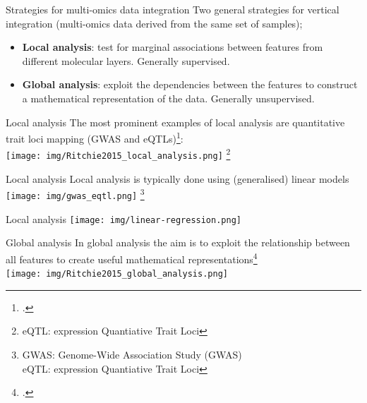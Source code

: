 \documentclass[aspectratio=169,notes]{beamer}
\newcommand\blfootnote[1]{%
  \begingroup
  \renewcommand\thefootnote{}\footnote{#1}%
  \addtocounter{footnote}{-1}%
  \endgroup
}
\begin{document}
	\begin{frame}{Strategies for multi-omics data integration}
	Two general strategies for vertical integration (multi-omics data derived from the same set of samples);
	\begin{itemize}
		\item \textbf{Local analysis}: test for marginal associations between features from different molecular layers. Generally supervised.
		\item \textbf{Global analysis}: exploit the dependencies between the features to construct a mathematical representation of the data. Generally unsupervised.
	\end{itemize}	
	\end{frame}

	\begin{frame}{Local analysis}
	The most prominent examples of local analysis are quantitative trait loci mapping (GWAS and eQTLs)\footcite{Ritchie2015}:\\
	\leavevmode\newline
	\centering
	\texttt{[image: img/Ritchie2015\_local\_analysis.png]}
	\blfootnote{eQTL: expression Quantiative Trait Loci}
	\end{frame}

	\begin{frame}{Local analysis}
	Local analysis is typically done using (generalised) linear models\\
	\leavevmode\newline
	\centering
	\texttt{[image: img/gwas\_eqtl.png]}
	\blfootnote{GWAS: Genome-Wide Association Study (GWAS)\\eQTL: expression Quantiative Trait Loci}
	\end{frame}

	\begin{frame}{Local analysis}
	\leavevmode\newline
	\centering
	\texttt{[image: img/linear-regression.png]}
	\end{frame}



	\begin{frame}{Global analysis}
	In global analysis the aim is to exploit the relationship between all features to create useful mathematical representations\footcite{Ritchie2015}\\
	\leavevmode\newline
	\centering
	\texttt{[image: img/Ritchie2015\_global\_analysis.png]}
	\end{frame}
\end{document}
